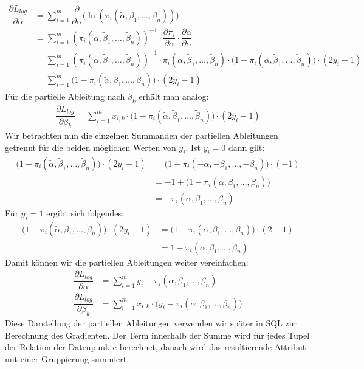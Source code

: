 \begin{align*}
    \dfrac{\partial L_{log}}{\partial \alpha} &= \sum_{i=1}^m \dfrac{\partial}{\partial \alpha} \bigg( \ln \left( \pi_i(\tilde\alpha, \tilde\beta_1, \dots, \tilde\beta_n) \right) \bigg) \\
    &= \sum_{i=1}^m \left( \pi_i(\tilde\alpha, \tilde\beta_1, \dots, \tilde\beta_n) \right)^{-1} \cdot \dfrac{\partial \pi_i}{\partial \tilde\alpha} \cdot \dfrac{\partial \tilde\alpha}{\partial \alpha} \\
    &= \sum_{i=1}^m \left( \pi_i(\tilde\alpha, \tilde\beta_1, \dots, \tilde\beta_n) \right)^{-1} \cdot \pi_i(\tilde\alpha, \tilde\beta_1, \dots, \tilde\beta_n) \cdot \big(1 - \pi_i(\tilde\alpha, \tilde\beta_1, \dots, \tilde\beta_n) \big) \cdot (2 y_i - 1) \\
    &= \sum_{i=1}^m \big(1 - \pi_i(\tilde\alpha, \tilde\beta_1, \dots, \tilde\beta_n) \big) \cdot (2 y_i - 1)
\end{align*}
Für die partielle Ableitung nach $\beta_k$ erhält man analog:
\begin{align*}
    \dfrac{\partial L_{log}}{\partial \beta_k} = \sum_{i=1}^m x_{i, k} \cdot \big(1 - \pi_i(\tilde\alpha, \tilde\beta_1, \dots, \tilde\beta_n) \big) \cdot (2 y_i - 1)
\end{align*}
Wir betrachten nun die einzelnen Summanden der partiellen Ableitungen getrennt für die beiden möglichen Werten von $y_i$. Ist $y_i = 0$ dann gilt:
\begin{align*}
    \big(1 - \pi_i(\tilde\alpha, \tilde\beta_1, \dots, \tilde\beta_n) \big) \cdot (2 y_i - 1) &= \big(1 - \pi_i(- \alpha, - \beta_1, \dots, - \beta_n) \big) \cdot (- 1) \\
    &= - 1 + \big(1 - \pi_i(\alpha, \beta_1, \dots, \beta_n) \big) \\
    &= - \pi_i(\alpha, \beta_1, \dots, \beta_n)
\end{align*}
Für $y_i = 1$ ergibt sich folgendes:
\begin{align*}
    \big(1 - \pi_i(\tilde\alpha, \tilde\beta_1, \dots, \tilde\beta_n) \big) \cdot (2 y_i - 1) &= \big(1 - \pi_i(\alpha, \beta_1, \dots, \beta_n) \big) \cdot (2 - 1) \\
    &= 1 - \pi_i(\alpha, \beta_1, \dots, \beta_n)
\end{align*}
Damit können wir die partiellen Ableitungen weiter vereinfachen:
\begin{align*}
    \dfrac{\partial L_{log}}{\partial \alpha} &= \sum_{i=1}^m y_i - \pi_i(\alpha, \beta_1, \dots, \beta_n) \\
    \dfrac{\partial L_{log}}{\partial \beta_k} &= \sum_{i=1}^m x_{i, k} \cdot \big(y_i - \pi_i(\alpha, \beta_1, \dots, \beta_n) \big)
\end{align*}
Diese Darstellung der partiellen Ableitungen verwenden wir später in SQL zur Berechnung des Gradienten. Der Term innerhalb der Summe wird für jedes Tupel der Relation der Datenpunkte berechnet, danach wird das resultierende Attribut mit einer Gruppierung summiert.
